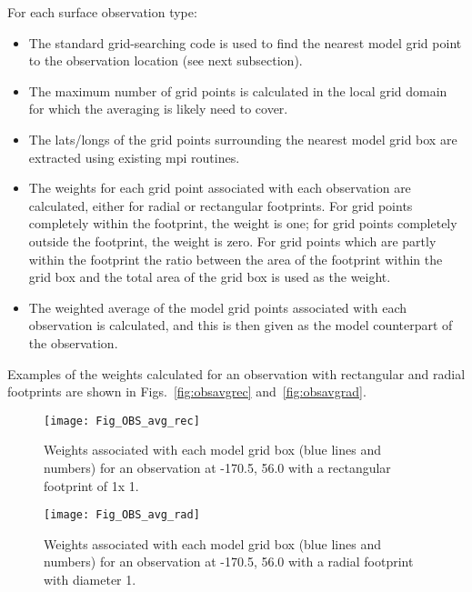 \documentclass[../main/NEMO_manual]{subfiles}
\begin{document}
For each surface observation type:
\begin{itemize}
\item The standard grid-searching code is used to find the nearest model grid point to the observation location
  (see next subsection).
\item The maximum number of grid points is calculated in the local grid domain for which
  the averaging is likely need to cover.
\item The lats/longs of the grid points surrounding the nearest model grid box are extracted using
  existing mpi routines.
\item The weights for each grid point associated with each observation are calculated,
  either for radial or rectangular footprints.
  For grid points completely within the footprint, the weight is one;
  for grid points completely outside the footprint, the weight is zero.
  For grid points which are partly within the footprint the ratio between the area of the footprint within
  the grid box and the total area of the grid box is used as the weight.
\item The weighted average of the model grid points associated with each observation is calculated,
  and this is then given as the model counterpart of the observation.
\end{itemize}

Examples of the weights calculated for an observation with rectangular and radial footprints are shown in
Figs.~\autoref{fig:obsavgrec} and~\autoref{fig:obsavgrad}.

\begin{figure}
  \begin{center}
    \texttt{[image: Fig\_OBS\_avg\_rec]}
    \caption{
      \protect\label{fig:obsavgrec}
      Weights associated with each model grid box (blue lines and numbers)
      for an observation at -170.5, 56.0 with a rectangular footprint of 1\deg x 1\deg.
    }
  \end{center}
\end{figure}

\begin{figure}
  \begin{center}
    \texttt{[image: Fig\_OBS\_avg\_rad]}
    \caption{
      \protect\label{fig:obsavgrad}
      Weights associated with each model grid box (blue lines and numbers)
      for an observation at -170.5, 56.0 with a radial footprint with diameter 1\deg.
    } 
  \end{center}
\end{figure}
\end{document}

